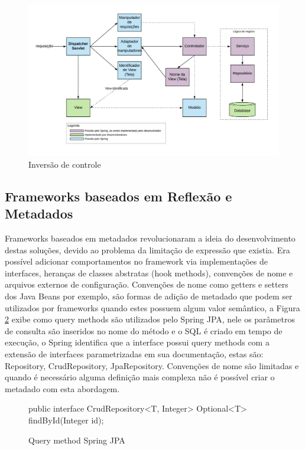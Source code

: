 \begin{figure}[H]
    \centering
    \includegraphics[scale=0.2]{src/imagens/cap2/arquitetura-spring-traduzida.png}
    \caption{Inversão de controle}
    \label{fig:inversao-controle}
\end{figure}

\subsection{Frameworks baseados em Reflexão e Metadados}

\par Frameworks baseados em metadados revolucionaram a ideia do desenvolvimento destas soluções, devido ao problema da limitação de expressão que existia. Era possível adicionar comportamentos no framework via implementações de interfaces, heranças de classes abstratas (hook methods), convenções de nome e arquivos externos de configuração. Convenções de nome como getters e setters dos Java Beans por exemplo, são formas de adição de metadado que podem ser utilizados por frameworks quando estes possuem algum valor semântico, a Figura \ref{fig:spring-qyery-method} exibe como query methods são utilizados pelo Spring JPA, nele os parâmetros de consulta são inseridos no nome do método e o SQL é criado em tempo de execução, o Spring identifica que a interface possui query methods com a extensão de interfaces parametrizadas em sua documentação, estas são: Repository, CrudRepository, JpaRepository. Convenções de nome são limitadas e quando é necessário alguma definição mais complexa não é possível criar o metadado com esta abordagem. 

\begin{figure}
    \centering
    \begin{java}
public interface CrudRepository<T, Integer> {
    Optional<T> findById(Integer id);
}
    \end{java}
    \caption{Query method Spring JPA}
    \label{fig:spring-qyery-method}
\end{figure}

